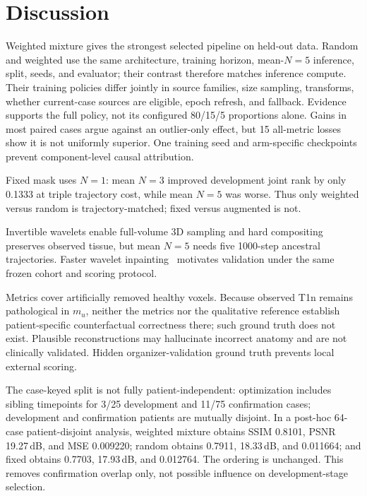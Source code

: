 \FloatBarrier
\section{Discussion}
\label{sec:discussion}

Weighted mixture gives the strongest selected pipeline on held-out data. Random and
weighted use the same architecture, training horizon, mean-$N=5$ inference, split,
seeds, and evaluator; their contrast therefore matches inference compute. Their
training policies differ jointly in source families, size sampling, transforms,
whether current-case sources are eligible, epoch refresh, and fallback. Evidence
supports the full policy, not its configured 80/15/5 proportions alone. Gains in
most paired cases argue against an outlier-only effect, but 15 all-metric losses show
it is not uniformly superior. One training seed and arm-specific checkpoints
prevent component-level causal attribution.

Fixed mask uses $N=1$: mean $N=3$ improved development joint rank by only 0.1333
at triple trajectory cost, while mean $N=5$ was worse. Thus only weighted versus
random is trajectory-matched; fixed versus augmented is not.

Invertible wavelets enable full-volume 3D sampling and hard compositing preserves
observed tissue, but mean $N=5$ needs five 1000-step ancestral trajectories. Faster
wavelet inpainting~\cite{durrer2026fastwdm3d} motivates validation under the same
frozen cohort and scoring protocol.

Metrics cover artificially removed healthy voxels. Because observed T1n remains
pathological in $m_u$, neither the metrics nor the qualitative reference establish
patient-specific counterfactual correctness there; such ground truth does not
exist. Plausible reconstructions may hallucinate incorrect anatomy and are not
clinically validated. Hidden organizer-validation ground truth prevents local
external scoring.

The case-keyed split is not fully patient-independent: optimization includes sibling
timepoints for 3/25 development and 11/75 confirmation cases; development and
confirmation patients are mutually disjoint. In a post-hoc 64-case patient-disjoint
analysis, weighted mixture obtains SSIM 0.8101, PSNR 19.27\,dB, and MSE 0.009220;
random obtains 0.7911, 18.33\,dB, and 0.011664; and fixed obtains 0.7703,
17.93\,dB, and 0.012764. The ordering is unchanged. This removes confirmation
overlap only, not possible influence on development-stage selection.


